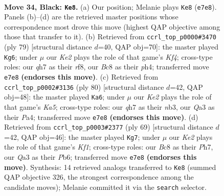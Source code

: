 \documentclass[11pt]{article}
\begin{document}
\clearpage

\begin{figure}[p]\centering
\begin{subfigure}{0.46\textwidth}\centering
\resizebox{\linewidth}{!}{%
\newchessgame
\chessboard[
  setfen={r1b5/4k2Q/2p1p3/p3P3/P4P2/q7/4K3/6N1 b - - 1 34},
  showmover=false,
  pgfstyle=straightmove, color=movearrow, markmove={e7-e8}
]}
\caption{}
\end{subfigure}\hfill
\begin{subfigure}{0.46\textwidth}\centering
\resizebox{\linewidth}{!}{%
\newchessgame
\chessboard[
  setfen={5R2/8/8/3rpk2/2p2p1P/2P2P2/1P6/6K1 b - - 5 40},
  showmover=false,
  pgfstyle=straightmove, color=movearrow, markmove={f5-g6}
]}
\caption{}
\end{subfigure}
\\[4pt]
\begin{subfigure}{0.46\textwidth}\centering
\resizebox{\linewidth}{!}{%
\newchessgame
\chessboard[
  setfen={8/p7/2k5/K3p1p1/P3P2p/1n3P2/4B2P/8 w - - 5 41},
  showmover=false,
  pgfstyle=straightmove, color=movearrow, markmove={a5-a6}
]}
\caption{}
\end{subfigure}\hfill
\begin{subfigure}{0.46\textwidth}\centering
\resizebox{\linewidth}{!}{%
\newchessgame
\chessboard[
  setfen={3Q1k2/p4p1p/1p6/8/P1p5/5qPP/2P5/4K3 b - - 2 35},
  showmover=false,
  pgfstyle=straightmove, color=movearrow, markmove={f8-g7}
]}
\caption{}
\end{subfigure}
\caption{\textbf{Move 34, Black: \texttt{Ke8}.} (a) Our position; Melanie plays \texttt{Ke8} (\texttt{e7e8}). Panels (b)--(d) are the retrieved master positions whose correspondence most drove this move (highest QAP objective among those that transfer to it). (b) Retrieved from \texttt{ccrl\_top\_p0000\#3470} (ply 79) [structural distance $d$=40, QAP obj=70]: the master played \texttt{Kg6}; under $\mu$ our \emph{Ke2} plays the role of that game's \emph{Kf4}; cross-type roles: our \emph{q}h7 as their \emph{r}f8, our \emph{B}c8 as their \emph{p}h4; transferred move \texttt{e7e8} \textbf{(endorses this move)}. (c) Retrieved from \texttt{ccrl\_top\_p0002\#3136} (ply 80) [structural distance $d$=42, QAP obj=48]: the master played \texttt{Ka6}; under $\mu$ our \emph{Ke2} plays the role of that game's \emph{Ka5}; cross-type roles: our \emph{q}h7 as their \emph{n}b3, our \emph{Q}a3 as their \emph{P}a4; transferred move \texttt{e7e8} \textbf{(endorses this move)}. (d) Retrieved from \texttt{ccrl\_top\_p0003\#2377} (ply 69) [structural distance $d$=42, QAP obj=46]: the master played \texttt{Kg7}; under $\mu$ our \emph{Ke2} plays the role of that game's \emph{Kf1}; cross-type roles: our \emph{B}c8 as their \emph{P}h7, our \emph{Q}a3 as their \emph{P}b6; transferred move \texttt{e7e8} \textbf{(endorses this move)}. Synthesis: 14 retrieved analogs transferred to \texttt{Ke8} (summed QAP objective 326, the strongest correspondence among the candidate moves); Melanie committed it via the \texttt{search} selector.}
\label{fig:thought-m67}
\end{figure}
\end{document}
